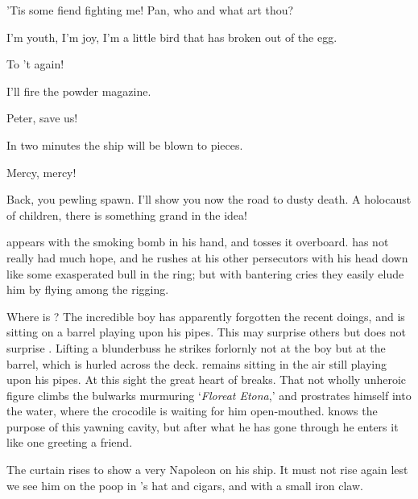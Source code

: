 \begin{drama}

\hookspeaks
’Tis some fiend fighting me!
Pan, who and what art thou?


I’m youth, I’m joy, I’m a little bird that has broken out of the egg.

\hookspeaks
To ’t again!


I’ll fire the powder magazine.

Peter, save us!


In two minutes the ship will be blown to pieces.


Mercy, mercy!

\hookspeaks
Back, you pewling spawn.
I’ll show you now the road to dusty death.
A holocaust of children, there is something grand in the idea!

{\peter appears with the smoking bomb in his hand, and tosses it overboard.
\hook has not really had much hope,
and he rushes at his other persecutors with his head down like some exasperated bull in the ring;
but with bantering cries they easily elude him by flying among the rigging.

Where is \peter?
The incredible boy has apparently forgotten the recent doings,
and is sitting on a barrel playing upon his pipes.
This may surprise others but does not surprise \hook.
Lifting a blunderbuss he strikes forlornly
not at the boy but at the barrel, which is hurled across the deck.
\peter remains sitting in the air still playing upon his pipes.
At this sight the great heart of \hook breaks.
That not wholly unheroic figure climbs the bulwarks murmuring ‘\emph{Floreat Etona},’
and prostrates himself into the water, where the crocodile is waiting for him open‐mouthed.
\hook knows the purpose of this yawning cavity,
but after what he has gone through he enters it like one greeting a friend.

The curtain rises to show \peter a very Napoleon on his ship.
It must not rise again lest we see him on the poop in \hook’s hat and cigars,
and with a small iron claw.}

\end{drama}

\endinput
